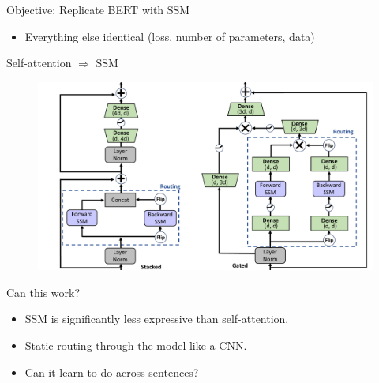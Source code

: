 \documentclass[14pt,aspectratio=169]{beamer}
\begin{document}
\begin{frame}{Objective: Replicate BERT with SSM}
\begin{itemize}
    \item Everything else identical (loss, number of parameters, data) 
\end{itemize}
\end{frame}



\begin{frame}{ Self-attention $\Rightarrow$ SSM}
\begin{figure}
    \centering
    \includegraphics[height=0.8\textheight,trim={0 0 18cm 0},clip]{Figs/model_architecture_comparison2.pdf}
    \caption{}
    \label{}
\end{figure}
\end{frame}

\begin{frame}{Can this work?}
\begin{itemize}
    \item SSM is significantly less expressive than self-attention.     
    \item Static routing through the model like a CNN.
    \item Can it learn to do  across sentences?
\end{itemize}
\pause 
\vspace{0.5cm}




\end{frame}
\end{document}
